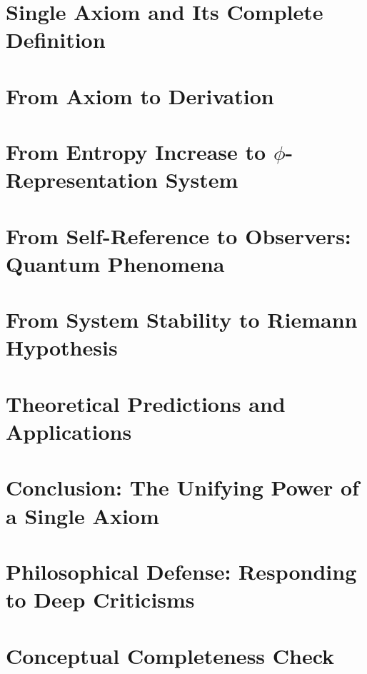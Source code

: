 \documentclass[12pt,a4paper]{book}
\theoremstyle{definition}
\theoremstyle{colored}
\begin{document}
\chapter{Single Axiom and Its Complete Definition}
\label{ch:axiom}


\chapter{From Axiom to Derivation}
\label{ch:derivation}


\chapter{From Entropy Increase to $\phi$-Representation System}
\label{ch:encoding}


\chapter{From Self-Reference to Observers: Quantum Phenomena}
\label{ch:quantum}


\chapter{From System Stability to Riemann Hypothesis}
\label{ch:riemann}


\chapter{Theoretical Predictions and Applications}
\label{ch:applications}


\chapter{Conclusion: The Unifying Power of a Single Axiom}
\label{ch:conclusion}


\chapter{Philosophical Defense: Responding to Deep Criticisms}
\label{ch:defense}


\chapter{Conceptual Completeness Check}
\label{ch:completeness}

\end{document}
